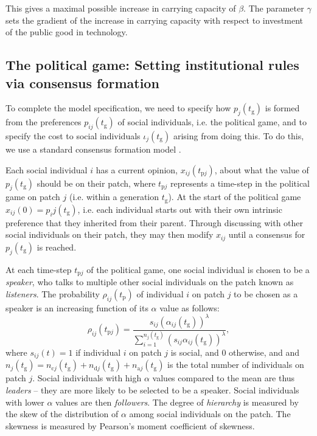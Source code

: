 \documentclass{rstb}
\begin{document}
\begin{linenumbers}
 This gives a maximal possible increase in carrying capacity of $\beta$. The parameter $\gamma$ sets the gradient of the increase in carrying capacity with respect to investment of the public good in technology.

\subsection*{The political game: Setting institutional rules via consensus formation} 
To complete the model specification, we need to specify how $p_j(t_\mathrm{g})$ is formed from the preferences $p_{ij}(t_\mathrm{g})$ of social individuals, i.e. the political game, and to specify the cost to social individuals $\iota_j(t_\mathrm{g})$ arising from doing this. To do this, we use a standard consensus formation model \cite{Gavrilets:2016:a,Perret:2020:a,Perret:2021:a}.

Each social individual $i$ has a current opinion, $x_{ij}(t_{\mathrm{p}j})$, about what the value of $p_j(t_\mathrm{g})$ should be on their patch, where $t_{\mathrm{p}j}$ represents a time-step in the political game on patch $j$ (i.e. within a generation $t_\mathrm{g}$). At the start of the political game $x_{ij}(0)=p_ij(t_\mathrm{g})$, i.e. each individual starts out with their own intrinsic preference that they inherited from their parent. Through discussing with other social individuals on their patch, they may then modify $x_{ij}$ until a consensus for $p_j(t_\mathrm{g})$ is reached.

At each time-step $t_{\mathrm{p}j}$ of the political game, one social individual is chosen to be a \emph{speaker}, who talks to multiple other social individuals on the patch known as \emph{listeners}. The probability $\rho_{ij}(t_\mathrm{p})$ of individual $i$ on patch $j$ to be chosen as a speaker is an increasing function of its $\alpha$ value as follows:
\begin{equation}
\rho_{ij}(t_{\mathrm{p}j})=\frac{s_{ij}(\alpha_{ij}(t_\mathrm{g}))^\lambda}{{\sum_{i=1}^{n_j(t_\mathrm{g})}}\left(s_{ij}\alpha_{ij}\left(t_\mathrm{g}\right)\right)^\lambda},
\label{eqnProbSpeaker}
\end{equation}
where $s_{ij}(t)=1$ if individual $i$ on patch $j$ is social, and 0 otherwise, and and $n_{j}(t_\mathrm{g})=n_{\mathrm{c}j}(t_\mathrm{g})+n_{\mathrm{d}j}(t_\mathrm{g})+n_{\mathrm{a}j}(t_\mathrm{g})$ is the total number of individuals on patch $j$. Social individuals with high $\alpha$ values compared to the mean are thus \emph{leaders} -- they are more likely to be selected to be a speaker. Social individuals with lower $\alpha$ values are then \emph{followers}. The degree of \emph{hierarchy} is measured by the skew of the distribution of $\alpha$ among social individuals on the patch. The skewness is measured by Pearson's moment coefficient of skewness.


\end{linenumbers}
\end{document}
